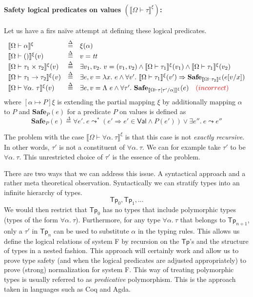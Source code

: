 \documentclass{article}
\newcommand{\TT}{\mathit{tt}}
\newcommand{\VAL}{\mathsf{Val}}
\newcommand{\UNT}{()}
\newcommand{\defeq}{\overset{\Delta}{=}}
\newcommand{\semtyp}[2]{\llbracket #2 \rrbracket_{#1}}
\begin{document}
\paragraph{Safety logical predicates on values $\left(\semtyp{}{\Omega \vdash \tau}^{\xi}\right)$:}
Let us have a firs na\"ive attempt at defining these logical
predicates.
\[
\begin{array}{lll}
\semtyp{}{\Omega \vdash \alpha}^{\xi} &\defeq& \xi(\alpha)\\
\semtyp{}{\Omega \vdash \UNT}^{\xi}(v) &\defeq& v = \TT\\
\semtyp{}{\Omega \vdash \tau_1 \times \tau_2}^{\xi}(v) &\defeq& \exists v_1, v_2.~v = (v_1, v_2) \land
\semtyp{}{\Omega \vdash \tau_1}^{\xi}(v_1) \land \semtyp{}{\Omega \vdash \tau_1}^{\xi}(v_2)\\
\semtyp{}{\Omega \vdash \tau_1 \to \tau_2}^{\xi}(v) &\defeq& \exists e, v = \lambda x.~e\land
\forall v'.~\semtyp{}{\Omega \vdash \tau_1}^{\xi}(v') \Rightarrow \mathbf{Safe}_{\semtyp{}{\Omega \vdash \tau_2}^{\xi}}(e[v/x])\\
\semtyp{}{\Omega \vdash \forall \alpha.~\tau}^{\xi}(v) &\defeq& \exists e, v = \Lambda~e\land
\forall \tau'.~\mathbf{Safe}_{\semtyp{}{\Omega \vdash \tau[\tau'/\alpha]}^{\xi}}(e) \hspace{1em} {\color{red}(incorrect)}
\end{array}
\]
where $[\alpha \mapsto P]\xi$ is extending the partial mapping $\xi$ by additionally mapping $\alpha$ to $P$ and $\mathbf{Safe}_{P}(e)$ for a predicate $P$ on values is defined as
\[
\mathbf{Safe}_{P}(e) \defeq \forall e'.~ e \leadsto^* (e'
\Rightarrow e' \in \VAL \land P(e')) \lor \exists e''.~e\leadsto e''
\]

The problem with the case $\semtyp{}{\Omega \vdash \forall \alpha.~\tau}^{\xi}$ is that this case is not \emph{exactly recursive}.
In other words, $\tau'$ is not a constituent of $\forall \alpha.~\tau$.
We can for example take $\tau'$ to be $\forall \alpha.~\tau$. This unrestricted choice of $\tau'$ is the essence of the problem.

There are two ways that we can address this issue.
A syntactical approach and a rather meta theoretical observation.
Syntactically we can stratify types into an infinite hierarchy of types.
\[\mathsf{Tp}_0, \mathsf{Tp}_1, \dots\]
We would then restrict that $\mathsf{Tp}_0$ has no types that include polymorphic types (types of the form $\forall \alpha.~\tau$).
Furthermore, for any type $\forall \alpha.~\tau$ that belongs to
$\mathsf{Tp}_{n+1}$, only a $\tau'$ in $\mathsf{Tp}_n$ can be
used to substitute $\alpha$ in the typing rules.
This allows us define the logical relations of system F by recursion on the $\mathsf{Tp}$'s and the structure of types in a
nested fashion.
This approach will certainly work and allow us to prove type safety (and when the logical predicates are adjusted
appropriately) to prove (strong) normalization for system F.
This way of treating polymorphic types is usually referred to
as \emph{predicative} polymorphism.
This is the approach taken in languages such as Coq and Agda.
\end{document}
